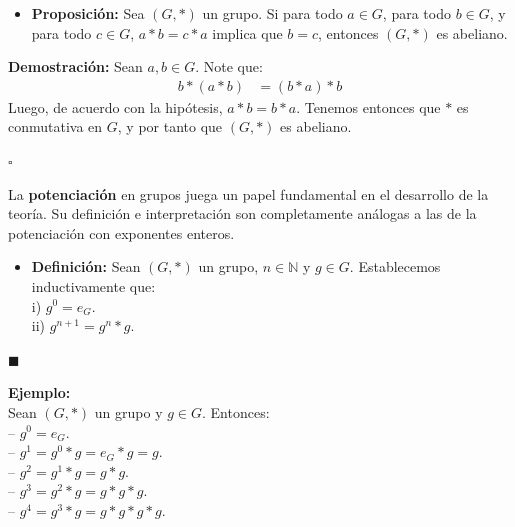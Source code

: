 \documentclass[10 pt]{article}
\begin{document}
\begin{itemize}
    \item \Large{\textbf{Proposición:} Sea $(G,*)$ un grupo. Si para todo $a \in G$, para todo $b \in G$, y para todo $c \in G$, $a*b=c*a$ implica que $b=c$, entonces $(G,*)$ es abeliano.} \\
\end{itemize}

\Large{\textbf{Demostración:} Sean $a,b \in G$. Note que:}
\begin{align*}
    b*(a*b)&=(b*a)*b
\end{align*}
\Large{Luego, de acuerdo con la hipótesis, $a*b=b*a$. Tenemos entonces que $*$ es conmutativa en $G$, y por tanto que $(G,*)$ es abeliano.} \\

\begin{flushright}
    $\square$
\end{flushright}

\Large{La \textbf{potenciación} en grupos juega un papel fundamental en el desarrollo de la teoría. Su definición e interpretación son completamente análogas a las de la potenciación con exponentes enteros.} \\

\begin{itemize}
    \item \Large{\textbf{Definición:} Sean $(G,*)$ un grupo, $n \in \mathbb N$ y $g \in G$. Establecemos inductivamente que: \\

    i) $g^0=e_G$. \\

    ii) $g^{n+1}=g^n * g$.} \\
\end{itemize}

\begin{flushright}
    $\blacksquare$
\end{flushright}

\Large{\textbf{Ejemplo:}} \\

\Large{Sean $(G,*)$ un grupo y $g \in G$. Entonces: \\

-- $g^0=e_G$. \\

-- $g^1=g^0*g=e_G*g=g$. \\

-- $g^2=g^1*g=g*g$. \\

-- $g^3=g^2*g=g*g*g$. \\

-- $g^4=g^3*g=g*g*g*g$.} \\
\end{document}
